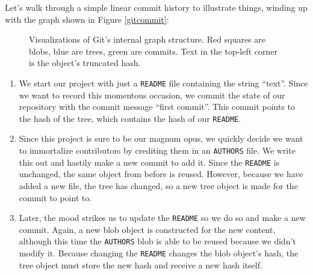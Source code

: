 \documentclass[]{article}
\begin{document}
Let's walk through a simple linear commit history to illustrate things, winding up with the graph shown in Figure \ref{gitcommit}:

\begin{figure}[h]
  \centering
  \qquad
  \caption[]%
    {Visualizations of Git's internal graph structure. Red squares are blobs, blue are trees, green are commits. Text in the top-left corner is the object's truncated hash.}
\end{figure}

\begin{enumerate}
\item We start our project with just a \texttt{README} file containing the string “text”. Since we want to record this momentous occasion, we commit the state of our repository with the commit message “first commit”. This commit points to the hash of the tree, which contains the hash of our \texttt{README}.
\item Since this project is sure to be our magnum opus, we quickly decide we want to immortalize contributors by crediting them in an \texttt{AUTHORS} file. We write this out and hastily make a new commit to add it. Since the \texttt{README} is unchanged, the same object from before is reused. However, because we have added a new file, the tree has changed, so a new tree object is made for the commit to point to.
\item Later, the mood strikes us to update the \texttt{README} so we do so and make a new commit. Again, a new blob object is constructed for the new content, although this time the \texttt{AUTHORS} blob is able to be reused because we didn't modify it. Because changing the \texttt{README} changes the blob object's hash, the tree object must store the new hash and receive a new hash itself.
\end{enumerate}
\end{document}
